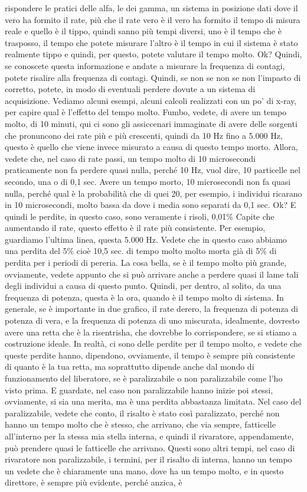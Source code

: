 rispondere le pratici delle alfa, le dei gamma, un sistema in posizione dati dove il vero ha formito il rate, più che il rate vero è il vero ha formito il tempo di misura reale e quello è il tippo, quindi sanno più tempi diversi, uno è il tempo che è trasposso, il tempo che potete misurare l'altro è il tempo in cui il sistema è stato realmente tippo e quindi, per questo, potete valutare il tempo molto. Ok? Quindi, se conoscete questa informazione e andate a misurare la frequenza di contagi, potete risalire alla frequenza di contagi. Quindi, se non se non se non l'impasto di corretto, potete, in modo di eventuali perdere dovute a un sistema di acquisizione. Vediamo alcuni esempi, alcuni calcoli realizzati con un po' di x-ray, per capire qual è l'effetto del tempo molto. Fumbo, vedete, di avere un tempo molto, di 10 minuti, qui ci sono gli assiccenari immaginate di avere delle sorgenti che pronuncono dei rate più e più crescenti, quindi da 10 Hz fino a 5.000 Hz, questo è quello che viene invece misurato a causa di questo tempo morto. Allora, vedete che, nel caso di rate passi, un tempo molto di 10 microsecondi praticamente non fa perdere quasi nulla, perché 10 Hz, vuol dire, 10 particelle nel secondo, una o di 0,1 sec. Avere un tempo morto, 10 microsecondi non fa quasi nulla, perché qual è la probabilità che di quei 20, per esempio, i individui ricarano in 10 microsecondi, molto bassa da dove i media sono separati da 0,1 sec. Ok? E quindi le perdite, in questo caso, sono veramente i risoli, 0,01\% Capite che aumentando il rate, questo effetto è il rate più consistente. Per esempio, guardiamo l'ultima linea, questa 5.000 Hz. Vedete che in questo caso abbiamo una perdita del 5\% cioè 10,5 sec. di tempo molto molto morta già di 5\% di perdita per i periodi di pereria. La cosa bella, se è il tempo molto più grande, ovviamente, vedete appunto che si può arrivare anche a perdere quasi il lame tali degli individui a causa di questo punto. Quindi, per dentro, al solito, da una frequenza di potenza, questa è la ora, quando è il tempo molto di sistema. In generale, se è importante in due grafico, il rate derero, la frequenza di potenza di potenza di vera, e la frequenza di potenza di uno miscurata, idealmente, dovresto avere una retta che è la risentrisha, che dovrebbe lo corrispondere, se si stiamo a costruzione ideale. In realtà, ci sono delle perdite per il tempo molto, e vedete che queste perdite hanno, dipendono, ovviamente, il tempo è sempre più consistente di quanto è la tua retta, ma soprattutto dipende anche dal mondo di funzionamento del liberatore, se è paralizzabile o non paralizzabile come l'ho visto prima. E guardate, nel caso non paralizzabile hanno inizie poi stessi, ovviamente, si sia una merita, ma è una perdita abbastanza limitata. Nel caso del paralizzabile, vedete che conto, il risalto è stato così paralizzato, perché non hanno un tempo molto che è stesso, che arrivano, che via sempre, fatticelle all'interno per la stessa mia stella interna, e quindi il rivaratore, appendamente, può prendere quasi le fatticelle che arrivano. Questi sono altri tempi, nel caso di rivaratore non paralizzabile, i termini, per il risalto di interna, hanno un tempo un vedete che è chiaramente una mano, dove ha un tempo molto, e in questo direttore, è sempre più evidente, perché anzica, è 